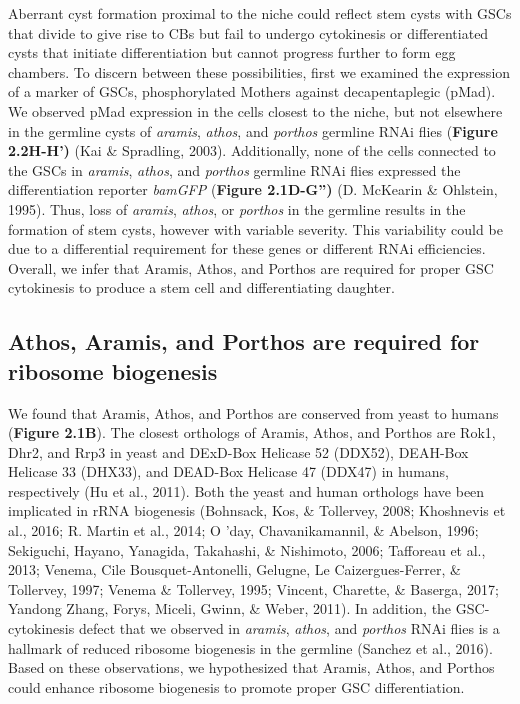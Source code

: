\documentclass[12pt,oneside]{reedthesis}
\begin{document}
Aberrant cyst formation proximal to the niche could reflect stem cysts
with GSCs that divide to give rise to CBs but fail to undergo
cytokinesis or differentiated cysts that initiate differentiation but
cannot progress further to form egg chambers. To discern between these
possibilities, first we examined the expression of a marker of GSCs,
phosphorylated Mothers against decapentaplegic (pMad). We observed pMad
expression in the cells closest to the niche, but not elsewhere in the
germline cysts of \emph{aramis}, \emph{athos}, and \emph{porthos} germline RNAi flies
(\textbf{Figure 2.2H-H')} (Kai \& Spradling, 2003). Additionally, none
of the cells connected to the GSCs in \emph{aramis}, \emph{athos}, and \emph{porthos}
germline RNAi flies expressed the differentiation reporter \emph{bamGFP}
(\textbf{Figure 2.1D-G'')} (D. McKearin \& Ohlstein, 1995). Thus, loss of \emph{aramis},
\emph{athos}, or \emph{porthos} in the germline results in the formation of stem
cysts, however with variable severity. This variability could be due to
a differential requirement for these genes or different RNAi
efficiencies. Overall, we infer that Aramis, Athos, and Porthos are
required for proper GSC cytokinesis to produce a stem cell and
differentiating daughter.

\hypertarget{athos-aramis-and-porthos-are-required-for-ribosome-biogenesis}{%
\subsection{Athos, Aramis, and Porthos are required for ribosome biogenesis}\label{athos-aramis-and-porthos-are-required-for-ribosome-biogenesis}}

We found that Aramis, Athos, and Porthos are conserved from yeast to
humans (\textbf{Figure 2.1B}). The closest orthologs of Aramis, Athos, and
Porthos are Rok1, Dhr2, and Rrp3 in yeast and DExD-Box Helicase 52
(DDX52), DEAH-Box Helicase 33 (DHX33), and DEAD-Box Helicase 47 (DDX47)
in humans, respectively (Hu et al., 2011). Both
the yeast and human orthologs have been implicated in rRNA biogenesis
(Bohnsack, Kos, \& Tollervey, 2008; Khoshnevis et al., 2016; R. Martin et al., 2014; O 'day, Chavanikamannil, \& Abelson, 1996; Sekiguchi, Hayano, Yanagida, Takahashi, \& Nishimoto, 2006; Tafforeau et al., 2013; Venema, Cile Bousquet-Antonelli, Gelugne, Le Caizergues-Ferrer, \& Tollervey, 1997; Venema \& Tollervey, 1995; Vincent, Charette, \& Baserga, 2017; Yandong Zhang, Forys, Miceli, Gwinn, \& Weber, 2011). In addition, the
GSC-cytokinesis defect that we observed in \emph{aramis}, \emph{athos}, and
\emph{porthos} RNAi flies is a hallmark of reduced ribosome biogenesis in the
germline (Sanchez et al., 2016). Based on these observations, we
hypothesized that Aramis, Athos, and Porthos could enhance ribosome
biogenesis to promote proper GSC differentiation.
\end{document}
